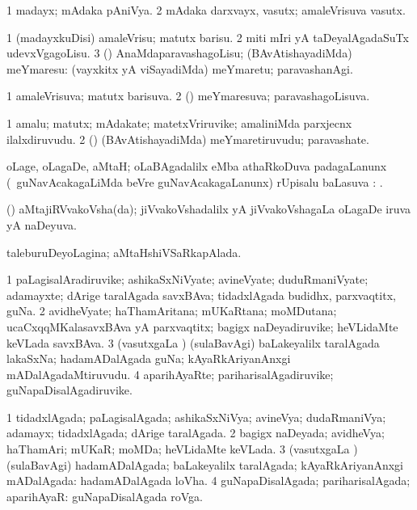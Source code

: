 \bentry
{}
\gl{\nA}
\bmng
\bnum
\num{1} madayx; mAdaka pAniVya. 
\num{2} mAdaka darxvayx, vasutx; amaleVrisuva vasutx. 
\enum
\emng
\eentry

\bentry
{}
\gl{\sakirx}
\bmng
\bnum
\num{1} (madayxkuDisi) amaleVrisu; matutx barisu. 
\num{2} miti mIri yA taDeyalAgadaSuTx udevxVgagoLisu. 
\num{3} (\rUpa) AnaMdaparavashagoLisu; (BAvAtishayadiMda) meYmaresu:   (vayxkitx yA viSayadiMda) meYmaretu; paravashanAgi. 
\enum
\emng
\eentry

\bentry
{}
\gl{\gu}
\bmng
\bnum
\num{1} amaleVrisuva; matutx barisuva. 
\num{2} (\rUpa) meYmaresuva; paravashagoLisuva. 
\enum
\emng
\eentry

\bentry
{}
\gl{\nA}
\bmng
\bnum
\num{1} amalu; matutx; mAdakate; matetxVriruvike; amaliniMda parxjecnx ilalxdiruvudu. 
\num{2} (\rUpa) (BAvAtishayadiMda) meYmaretiruvudu; paravashate. 
\enum
\emng
\eentry

\bentry
{}
\gl{\pUparx}
\bmng
oLage, oLagaDe, aMtaH; oLaBAgadalilx eMba athaRkoDuva padagaLanunx (\sA\ guNavAcakagaLiMda beVre guNavAcakagaLanunx) rUpisalu baLasuva \pUparx: . 
\emng
\eentry

\bentry
{}
\gl{\gu}
\bmng
(\jiVvi) aMtajiRVvakoVsha(da); jiVvakoVshadalilx yA jiVvakoVshagaLa oLagaDe iruva yA naDeyuva. 
\emng
\eentry

\bentry
{}
\gl{\gu}
\bmng
taleburuDeyoLagina; aMtaHshiVSaRkapAlada. 
\emng
\eentry

\bentry
{}
\gl{\nA}
\bmng
\bnum
\num{1} paLagisalAradiruvike; ashikaSxNiVyate; avineVyate; duduRmaniVyate; adamayxte; dArige taralAgada savxBAva; tidadxlAgada budidhx, parxvaqtitx, guNa. 
\num{2} avidheVyate; haThamAritana; mUKaRtana; moMDutana; ucaCxqqMKalasavxBAva yA parxvaqtitx; bagigx naDeyadiruvike; heVLidaMte keVLada savxBAva. 
\num{3} (vasutxgaLa \vi) (sulaBavAgi) baLakeyalilx taralAgada lakaSxNa; hadamADalAgada guNa; kAyaRkAriyanAnxgi mADalAgadaMtiruvudu. 
\num{4} aparihAyaRte; pariharisalAgadiruvike; guNapaDisalAgadiruvike. 
\enum
\emng
\eentry

\bentry
{}
\gl{\gu}
\bmng
\bnum
\num{1} tidadxlAgada; paLagisalAgada; ashikaSxNiVya; avineVya; dudaRmaniVya; adamayx; tidadxlAgada; dArige taralAgada. 
\num{2} bagigx naDeyada; avidheVya; haThamAri; mUKaR; moMDa; heVLidaMte keVLada. 
\num{3} (vasutxgaLa \vi) (sulaBavAgi) hadamADalAgada; baLakeyalilx taralAgada; kAyaRkAriyanAnxgi mADalAgada:  hadamADalAgada loVha. 
\num{4} guNapaDisalAgada; pariharisalAgada; aparihAyaR:  guNapaDisalAgada roVga. 
\enum
\emng
\eentry

